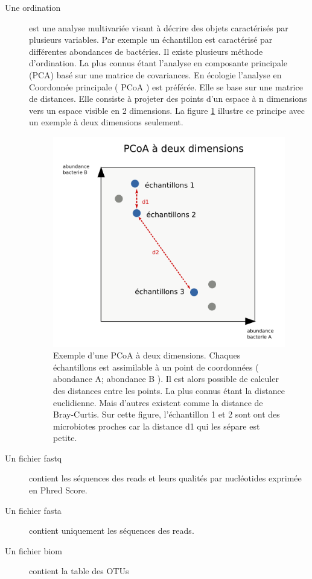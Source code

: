 \documentclass[12pt,a4paper]{article}
\begin{document}
\begin{description}
\item[Une ordination] est une analyse multivariée visant à décrire des objets caractérisés par plusieurs variables. Par exemple un échantillon est caractérisé par différentes abondances de bactéries. Il existe plusieurs méthode d'ordination. La plus connus étant l'analyse en composante principale (PCA) basé sur une matrice de covariances. En écologie l'analyse en Coordonnée principale ( PCoA ) est préférée. Elle se base sur une matrice de distances. Elle consiste à projeter des points d'un espace à n dimensions vers un espace visible en 2 dimensions.
La figure \ref{pcoatuto} illustre ce principe avec un exemple à deux dimensions seulement. 


\begin{figure}[!h]
\begin{center}
\includegraphics[scale=0.6]{img/pcoatuto.png}\hfill
\end{center}
\caption{Exemple d'une PCoA à deux dimensions. Chaques échantillons est assimilable à un point de coordonnées ( abondance A; abondance B ). Il est alors possible de calculer des distances entre les points. La plus connus étant la distance euclidienne. Mais d'autres existent comme la distance de Bray-Curtis. Sur cette figure, l’échantillon 1 et 2 sont ont des microbiotes proches car la distance d1 qui les sépare est petite. }
\label{pcoatuto}
\end{figure}


\newpage


\item[Un fichier fastq] contient les séquences des reads et leurs qualités par nucléotides exprimée en Phred Score.
\item[Un fichier fasta] contient uniquement les séquences des reads. 
\item[Un fichier biom] contient la table des OTUs

\end{description}
\end{document}
